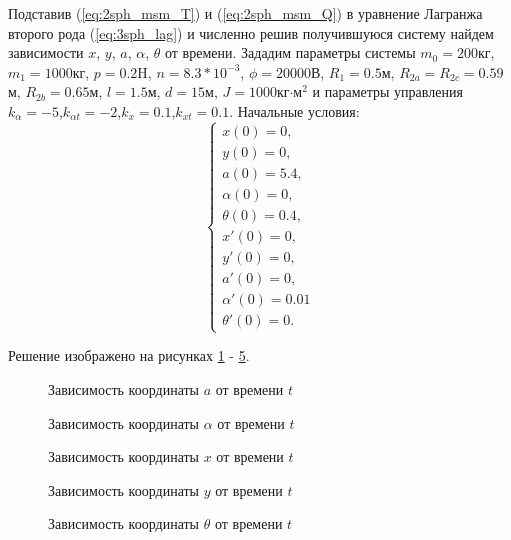 Подставив (\ref{eq:2sph_msm_T}) и (\ref{eq:2sph_msm_Q}) в уравнение Лагранжа второго рода (\ref{eq:3sph_lag}) и численно решив получившуюся систему найдем зависимости $x$, $y$, $a$, $\alpha$, $\theta$ от времени.
Зададим параметры системы $m_0 = 200$кг, $m_1=1000$кг, $p=0.2$H, $n=8.3 * 10^{-3}$, $\phi = 20000$В, $R_1 = 0.5$м, $R_{2a} = R_{2c} = 0.59$м, $R_{2b} = 0.65$м, $l = 1.5$м, $d = 15$м, $J = 1000$кг$\cdot$м${}^2$ и параметры управления $k_\alpha = -5$,$k_{\alpha t} = -2$,$k_x = 0.1$,$k_{x t} = 0.1$.
Начальные условия:
\begin{equation}
	\begin{cases}
		x(0) = 0, \\
		y(0) = 0, \\
		a(0) = 5.4, \\
		\alpha(0) = 0,\\
		\theta(0) = 0.4,\\
		x'(0) = 0, \\
		y'(0) = 0, \\
		a'(0) = 0, \\
		\alpha'(0) = 0.01\\
		\theta'(0) = 0.
	\end{cases}
\end{equation}

Решение изображено на рисунках \ref{ris:2sph_msm_a_no_u} - \ref{ris:2sph_msm_theta_no_u}.

\begin{figure}[H]
	\caption{Зависимость координаты $a$ от времени $t$}
	\label{ris:2sph_msm_a_no_u}
\end{figure}
\begin{figure}[H]
	\caption{Зависимость координаты $\alpha$ от времени $t$}
	\label{ris:2sph_msm_alpha_no_u}
\end{figure} 
\begin{figure}[H]
	\caption{Зависимость координаты $x$ от времени $t$}
	\label{ris:2sph_msm_x_no_u}
\end{figure} 
\begin{figure}[H]
	\caption{Зависимость координаты $y$ от времени $t$}
	\label{ris:2sph_msm_y_no_u}
\end{figure} 
\begin{figure}[H]
	\caption{Зависимость координаты $\theta$ от времени $t$}
	\label{ris:2sph_msm_theta_no_u}
\end{figure}

